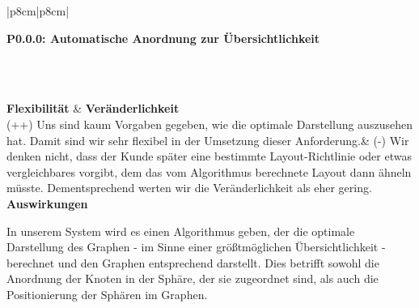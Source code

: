 \documentclass[enabledeprecatedfontcommands,fontsize=11pt,paper=a4,twoside]{scrartcl}
\newcounter{one}
\newcounter{two}[one]
\newcounter{three}[two]
\newcommand{\tone}{0\theone}
\newcommand{\ttwo}{0\thetwo}
\newcommand{\three}{\stepcounter{three}0\thethree}
\begin{document}
\begin{tabular} {|p{8cm}|p{8cm}|}
	\hline
	 {\parbox{16cm}{\textbf{\hypertarget{x}{P\tone.\ttwo.\three}: Automatische Anordnung zur Übersichtlichkeit}} } \\  \hline\hline 
	\rule{0pt}{7ex}\\ [3ex] \hline
	\textbf{Flexibilität}  & \textbf{Veränderlichkeit} \\
	(++) Uns sind kaum Vorgaben gegeben, wie die optimale Darstellung auszusehen hat. Damit sind wir sehr flexibel in der Umsetzung dieser Anforderung.& 
	(-) Wir denken nicht, dass der Kunde später eine bestimmte Layout-Richtlinie oder etwas vergleichbares vorgibt, dem das vom Algorithmus berechnete Layout dann ähneln müsste. Dementsprechend werten wir die Veränderlichkeit als eher gering.\\
	\hline
	 {\textbf{Auswirkungen}} \\
	 {\parbox{16cm}{In unserem System wird es einen Algorithmus geben, der die optimale Darstellung des Graphen - im Sinne einer größtmöglichen Übersichtlichkeit - berechnet und den Graphen entsprechend darstellt. Dies betrifft sowohl die Anordnung der Knoten in der Sphäre, der sie zugeordnet sind, als auch die Positionierung der Sphären im Graphen.} }\\ \hline
\end{tabular}
\\ \\ \\ \\ \\
\end{document}
